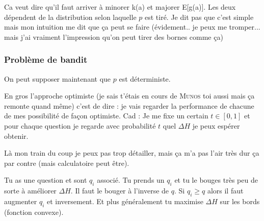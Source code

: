 \documentclass[12pt]{article}
\begin{document}
Ca veut dire qu'il faut arriver à minorer k(a) et majorer E[g(a)]. Les deux dépendent de la distribution selon laquelle $p$ est tiré. Je dit pas que c'est simple mais mon intuition me dit que ça peut se faire (évidement.. je peux me tromper... mais j'ai vraiment l'impression qu'on peut tirer des bornes comme ça)

\subsubsection{Problème de bandit}
On peut supposer maintenant que $p$ est déterministe. 

En gros l'approche optimiste (je sais t'étais en cours de \textsc{Munos} toi aussi mais ça remonte quand même) c'est de dire : je vais regarder la performance de chacune de mes possibilité de façon optimiste. Cad : Je me fixe un certain $t\in[0,1]$ et pour chaque question je regarde avec probabilité $t$ quel $\Delta H$ je peux espérer obtenir. 

Là mon train du coup je peux pas trop détailler, mais  ça m'a pas l'air très dur ça par contre (mais calculatoire peut être). 

Tu as une question et sont $q_i$ associé. Tu prends un $q_i$ et tu le bouges très peu de sorte à améliorer $\Delta H$. Il faut le bouger à l'inverse de $q$. Si $q_i \ge q$ alors il faut augmenter $q_i$ et inversement. Et plus généralement tu maximise $\Delta H$ sur les bords (fonction convexe). 
\end{document}
